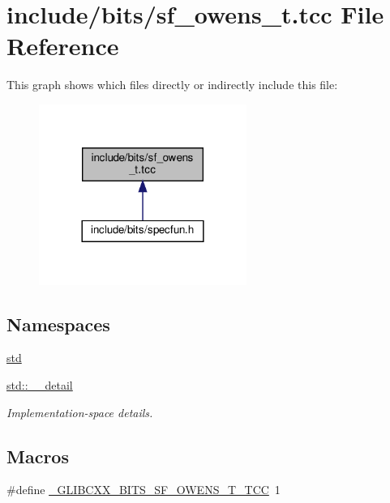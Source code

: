 \hypertarget{sf__owens__t_8tcc}{}\section{include/bits/sf\+\_\+owens\+\_\+t.tcc File Reference}
\label{sf__owens__t_8tcc}
This graph shows which files directly or indirectly include this file\+:
\nopagebreak
\begin{figure}[H]
\begin{center}
\leavevmode
\includegraphics[width=192pt]{sf__owens__t_8tcc__dep__incl}
\end{center}
\end{figure}
\subsection*{Namespaces}
\begin{DoxyCompactItemize}
\item 
 \hyperlink{namespacestd}{std}
\item 
 \hyperlink{namespacestd_1_1____detail}{std\+::\+\_\+\+\_\+detail}
\begin{DoxyCompactList}\small\item\em Implementation-\/space details. \end{DoxyCompactList}\end{DoxyCompactItemize}
\subsection*{Macros}
\begin{DoxyCompactItemize}
\item 
\#define \hyperlink{sf__owens__t_8tcc_a5986cbb2c459a5e859ffe2fe1fa7cd25}{\+\_\+\+G\+L\+I\+B\+C\+X\+X\+\_\+\+B\+I\+T\+S\+\_\+\+S\+F\+\_\+\+O\+W\+E\+N\+S\+\_\+\+T\+\_\+\+T\+CC}~1
\end{DoxyCompactItemize}
